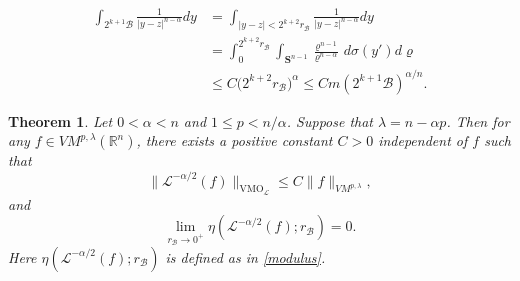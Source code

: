 \documentclass[10pt,a4paper]{amsart}
\newtheorem{theorem}{Theorem}
\begin{document}
\begin{equation}\label{wang2}
\begin{split}
\int_{2^{k+1}\mathcal{B}}\frac{1}{|y-z|^{n-\alpha}}dy
&=\int_{|y-z|<2^{k+2}r_{\mathcal{B}}}\frac{1}{|y-z|^{n-\alpha}}dy\\
&=\int_0^{2^{k+2}r_{\mathcal{B}}}\int_{\mathbf{S}^{n-1}}\frac{\varrho^{n-1}}{\varrho^{n-\alpha}}\,d\sigma(y')d\varrho\\
&\leq C\big(2^{k+2}r_{\mathcal{B}}\big)^{\alpha}\leq Cm(2^{k+1}\mathcal{B})^{\alpha/n}.
\end{split}
\end{equation}

\begin{theorem}\label{thm2}
Let $0<\alpha<n$ and $1\leq p<n/{\alpha}$. Suppose that $\lambda=n-\alpha p$. Then for any $f\in V{M}^{p,\lambda}(\mathbb R^n)$, there exists a positive constant $C>0$ independent of $f$ such that
\begin{equation*}
\big\|\mathcal L^{-\alpha/2}(f)\big\|_{\mathrm{VMO}_{\mathcal{L}}}
\leq C\big\|f\big\|_{V{M}^{p,\lambda}},
\end{equation*}
and
\begin{equation*}
\lim_{r_{\mathcal{B}}\to 0^{+}}\eta(\mathcal L^{-\alpha/2}(f);r_{\mathcal{B}})=0.
\end{equation*}
Here $\eta(\mathcal L^{-\alpha/2}(f);r_{\mathcal{B}})$ is defined as in \eqref{modulus}.
\end{theorem}
\end{document}
